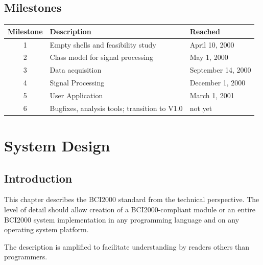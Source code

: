 \documentclass[letterpaper,oneside,12pt]{book}
\begin{document}





\section{Milestones}

\begin{tabular}{|c|l|l|}
 \hline
 \textbf{Milestone} & \textbf{Description} & \textbf{Reached}\\
 \hline
 1 & Empty shells and feasibility study & April 10, 2000\\
 \hline
 2 & Class model for signal processing & May 1, 2000\\
 \hline
 3 & Data acquisition & September 14, 2000\\
 \hline
 4 & Signal Processing & December 1, 2000\\
 \hline
 5 & User Application & March 1, 2001\\
 \hline
 6 & Bugfixes, analysis tools; transition to V1.0 & not yet\\
 \hline
\end{tabular}


\chapter{System Design} 

\section{Introduction}

This chapter describes the BCI2000 standard from the technical perspective. The 
level of detail should allow creation of a BCI2000-compliant module or an entire 
BCI2000 system implementation in any programming language and on any operating 
system platform.

The description is amplified to facilitate understanding by readers others than 
programmers.
\end{document}
